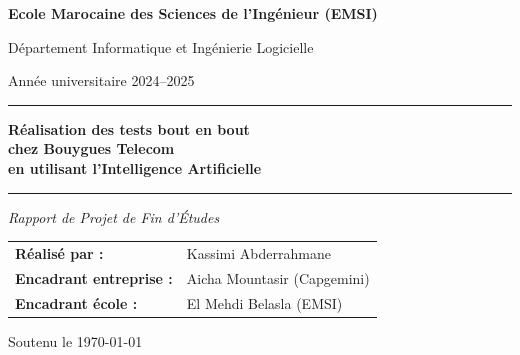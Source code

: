 \begin{titlepage}
\centering
\vspace{1cm}
{\large \textbf{Ecole Marocaine des Sciences de l'Ingénieur (EMSI)}}\par
\vspace{0.3cm}
{\large Département Informatique et Ingénierie Logicielle}\par
\vspace{0.3cm}
{\large Année universitaire 2024--2025}\par

\vspace{1.5cm}
\rule{\linewidth}{0.5mm}\par
\vspace{0.5cm}
{\LARGE \bfseries
Réalisation des tests bout en bout\\[0.3cm]
chez Bouygues Telecom\\[0.3cm]
en utilisant l'Intelligence Artificielle
}\par
\vspace{0.5cm}
\rule{\linewidth}{0.5mm}\par

\vspace{1cm}
{\large \textit{Rapport de Projet de Fin d'Études}}\par

\vspace{1.5cm}
\begin{tabular}{ll}
\textbf{Réalisé par :} & Kassimi Abderrahmane \\
\textbf{Encadrant entreprise :} & Aicha Mountasir (Capgemini) \\
\textbf{Encadrant école :} & El Mehdi Belasla (EMSI) \\
\end{tabular}

\vfill
{\small Soutenu le \today}\par
\end{titlepage}
